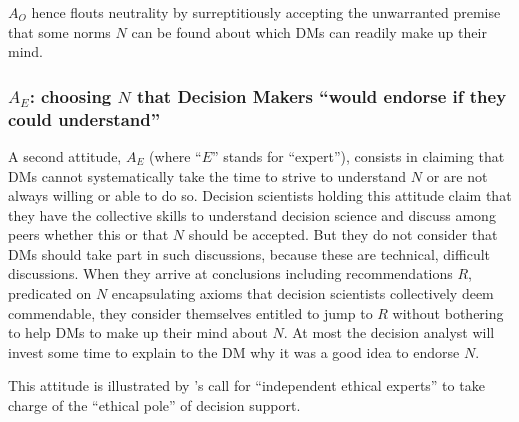 \documentclass[preprint, french, english, 11pt, authoryear]{elsarticle}%
\newcommand{\protectforpdf}[1]{\texorpdfstring{\ensuremath{#1}}{#1}}
\begin{document}
$A_O$ hence flouts neutrality by surreptitiously accepting the unwarranted premise that 
some norms $N$ can be found about which \acp{DM} can readily make up their mind.

\subsubsection{\texorpdfstring{$A_E$}{AE}: choosing \protectforpdf{N} that Decision Makers %
 “would endorse if they could understand”}

A second attitude, $A_E$ (where ``$E$'' stands for “expert”), consists in claiming that \acp{DM} cannot systematically take the time to strive to understand $N$ or are not always willing or able to do so. 
Decision scientists holding this attitude claim that they have the collective skills to understand decision science and discuss among peers whether this or that $N$ should be accepted. 
But they do not consider that \acp{DM} should take part in such discussions, because these are technical, difficult discussions. 
When they arrive at conclusions including recommendations $R$, predicated on $N$ encapsulating axioms that decision scientists collectively deem commendable, they consider themselves entitled to jump to $R$ without bothering to help \acp{DM} to make up their mind about $N$. 
At most the decision analyst will invest some time to explain to the \ac{DM} why it was a good idea to endorse $N$. %
\begin{changebar}
This attitude is illustrated by \citet{brans_ethics_2002}'s call for ``independent ethical experts'' to take charge of the ``ethical pole'' of decision support.%
\end{changebar}
\end{document}

